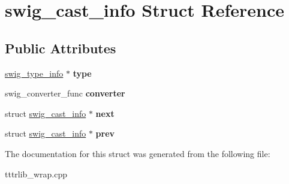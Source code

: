 \hypertarget{structswig__cast__info}{}\section{swig\+\_\+cast\+\_\+info Struct Reference}
\label{structswig__cast__info}
\subsection*{Public Attributes}
\begin{DoxyCompactItemize}
\item 
\mbox{\label{structswig__cast__info_a1c9023a301c8d6806209f4e10df6e9e0}} 
\hyperlink{structswig__type__info}{swig\+\_\+type\+\_\+info} $\ast$ {\bfseries type}
\item 
\mbox{\label{structswig__cast__info_aa630fddfbb1bf9c97a03f9479ba32f76}} 
swig\+\_\+converter\+\_\+func {\bfseries converter}
\item 
\mbox{\label{structswig__cast__info_ae79c6fa058a9d908bbdac14db0c9db5e}} 
struct \hyperlink{structswig__cast__info}{swig\+\_\+cast\+\_\+info} $\ast$ {\bfseries next}
\item 
\mbox{\label{structswig__cast__info_afc685bcf38a5a06c6601775138c5999c}} 
struct \hyperlink{structswig__cast__info}{swig\+\_\+cast\+\_\+info} $\ast$ {\bfseries prev}
\end{DoxyCompactItemize}


The documentation for this struct was generated from the following file\+:\begin{DoxyCompactItemize}
\item 
tttrlib\+\_\+wrap.\+cpp\end{DoxyCompactItemize}
